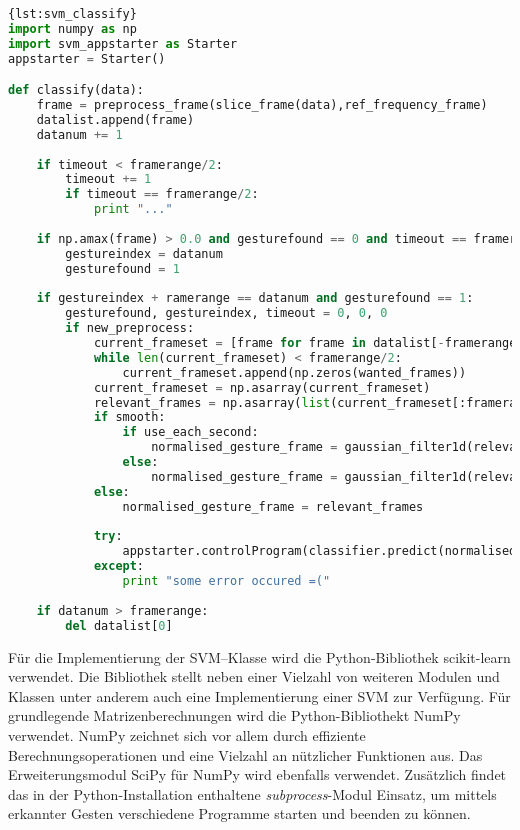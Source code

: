 \begin{lstlisting}[float=*,language=Python,caption={classify},label={lst:svm_classify}]{lst:svm_classify}
import numpy as np
import svm_appstarter as Starter
appstarter = Starter()

def classify(data):
	frame = preprocess_frame(slice_frame(data),ref_frequency_frame)
	datalist.append(frame)
	datanum += 1
	
	if timeout < framerange/2:
		timeout += 1
		if timeout == framerange/2:
			print "..."
	
	if np.amax(frame) > 0.0 and gesturefound == 0 and timeout == framerange/2:
		gestureindex = datanum
		gesturefound = 1
		
	if gestureindex + ramerange == datanum and gesturefound == 1:
		gesturefound, gestureindex, timeout = 0, 0, 0
		if new_preprocess:
			current_frameset = [frame for frame in datalist[-framerange:] if np.amax(frame) > 0]
			while len(current_frameset) < framerange/2:
				current_frameset.append(np.zeros(wanted_frames))
			current_frameset = np.asarray(current_frameset)
			relevant_frames = np.asarray(list(current_frameset[:framerange/2:2] + current_frameset[1:framerange/2:2])).reshape(wanted_frames*framerange/4,)
			if smooth:
				if use_each_second:
					normalised_gesture_frame = gaussian_filter1d(relevant_frames, 1.5)[::2]
				else:
					normalised_gesture_frame = gaussian_filter1d(relevant_frames, 1.5)
			else:
				normalised_gesture_frame = relevant_frames
			
			try:
				appstarter.controlProgram(classifier.predict(normalised_gesture_frame)[0])
			except:
				print "some error occured =("
			
	if datanum > framerange:
		del datalist[0]
\end{lstlisting}


Für die Implementierung der \ac{SVM}--Klasse wird die Python-Bibliothek scikit-learn verwendet. 
Die Bibliothek stellt neben einer Vielzahl von weiteren Modulen und Klassen unter anderem auch eine Implementierung einer \ac{SVM} zur Verfügung.
Für grundlegende Matrizenberechnungen wird die Python-Bibliothekt NumPy verwendet. NumPy zeichnet sich vor allem durch effiziente Berechnungsoperationen und eine Vielzahl an nützlicher Funktionen aus.
Das Erweiterungsmodul SciPy für NumPy wird ebenfalls verwendet.
Zusätzlich findet das in der Python-Installation enthaltene \textit{subprocess}-Modul Einsatz, um mittels erkannter Gesten verschiedene Programme starten und beenden zu können.


